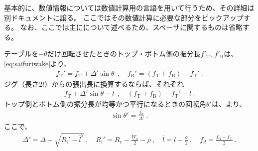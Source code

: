 




基本的に、数値情報については数値計算用の言語を用いて行うため、その詳細は別ドキュメントに譲る。
ここではその数値計算に必要な部分をピックアップする。
なお、ここでは主に\DMname について述べるため、スペーサに関するものは省略する。


テーブルを$-\theta$だけ回転させたときのトップ・ボトム側の振分長$f'_\mathrm T$, $f'_\mathrm B$は、\eqref{eq:saifuriwake}より、
\begin{align*}
  f_\mathrm T' = f_\mathrm T+\varDelta'\!\sin\theta~~, \quad
  f_\mathrm B' = (f_\mathrm T+f_\mathrm B)-f_\mathrm T'\ .
\end{align*}
ジグ（長さ$2l$）からの張出長に換算するならば、それぞれ
\begin{align*}
  f_\mathrm T+\varDelta'\!\sin\theta-l~~, \quad
  (f_\mathrm T+f_\mathrm B)-f_\mathrm T'-l\ .
\end{align*}
トップ側とボトム側の振分長が均等かつ平行になるときの回転角$\theta'$は、より、
\begin{align*}
  \sin\theta' = \frac{f_d}{\varDelta'}\ .
\end{align*}
ここで、
\begin{align*}
  \varDelta' = \varDelta+\sqrt{R_\mathrm i'-\bar l^2}\ , \quad
  R_\mathrm i' = R_\mathrm c-\frac{W_x}2-\rho\ ,\quad
  \bar l = l-\frac\sigma2\ ,\quad
  f_d = \frac{f_\mathrm B-f_\mathrm T}2\ .
\end{align*}



